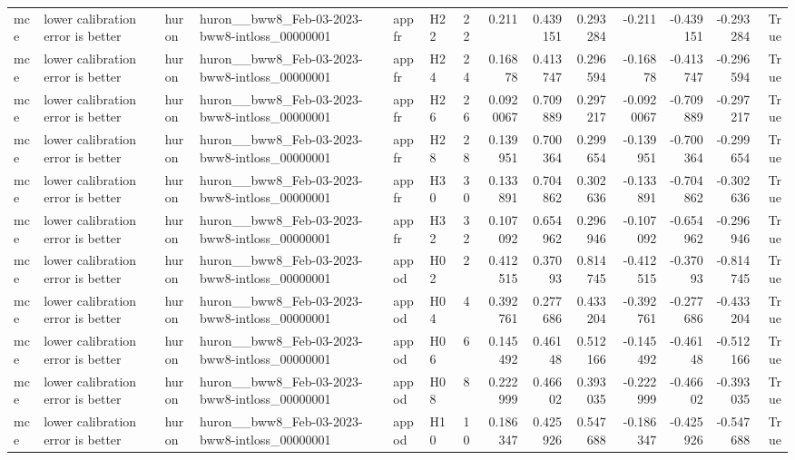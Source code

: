 \begin{longtable}{llllllrrrrrrrr}
mce & lower calibration error is better & huron & huron\_\_bww8\_Feb-03-2023-bww8-intloss\_00000001 & appfr & H22 & 22 & 0.211 & 0.439151 & 0.293284 & -0.211 & -0.439151 & -0.293284 & True \\
mce & lower calibration error is better & huron & huron\_\_bww8\_Feb-03-2023-bww8-intloss\_00000001 & appfr & H24 & 24 & 0.16878 & 0.413747 & 0.296594 & -0.16878 & -0.413747 & -0.296594 & True \\
mce & lower calibration error is better & huron & huron\_\_bww8\_Feb-03-2023-bww8-intloss\_00000001 & appfr & H26 & 26 & 0.0920067 & 0.709889 & 0.297217 & -0.0920067 & -0.709889 & -0.297217 & True \\
mce & lower calibration error is better & huron & huron\_\_bww8\_Feb-03-2023-bww8-intloss\_00000001 & appfr & H28 & 28 & 0.139951 & 0.700364 & 0.299654 & -0.139951 & -0.700364 & -0.299654 & True \\
mce & lower calibration error is better & huron & huron\_\_bww8\_Feb-03-2023-bww8-intloss\_00000001 & appfr & H30 & 30 & 0.133891 & 0.704862 & 0.302636 & -0.133891 & -0.704862 & -0.302636 & True \\
mce & lower calibration error is better & huron & huron\_\_bww8\_Feb-03-2023-bww8-intloss\_00000001 & appfr & H32 & 32 & 0.107092 & 0.654962 & 0.296946 & -0.107092 & -0.654962 & -0.296946 & True \\
mce & lower calibration error is better & huron & huron\_\_bww8\_Feb-03-2023-bww8-intloss\_00000001 & appod & H02 & 2 & 0.412515 & 0.37093 & 0.814745 & -0.412515 & -0.37093 & -0.814745 & True \\
mce & lower calibration error is better & huron & huron\_\_bww8\_Feb-03-2023-bww8-intloss\_00000001 & appod & H04 & 4 & 0.392761 & 0.277686 & 0.433204 & -0.392761 & -0.277686 & -0.433204 & True \\
mce & lower calibration error is better & huron & huron\_\_bww8\_Feb-03-2023-bww8-intloss\_00000001 & appod & H06 & 6 & 0.145492 & 0.46148 & 0.512166 & -0.145492 & -0.46148 & -0.512166 & True \\
mce & lower calibration error is better & huron & huron\_\_bww8\_Feb-03-2023-bww8-intloss\_00000001 & appod & H08 & 8 & 0.222999 & 0.46602 & 0.393035 & -0.222999 & -0.46602 & -0.393035 & True \\
mce & lower calibration error is better & huron & huron\_\_bww8\_Feb-03-2023-bww8-intloss\_00000001 & appod & H10 & 10 & 0.186347 & 0.425926 & 0.547688 & -0.186347 & -0.425926 & -0.547688 & True \\

\end{longtable}
